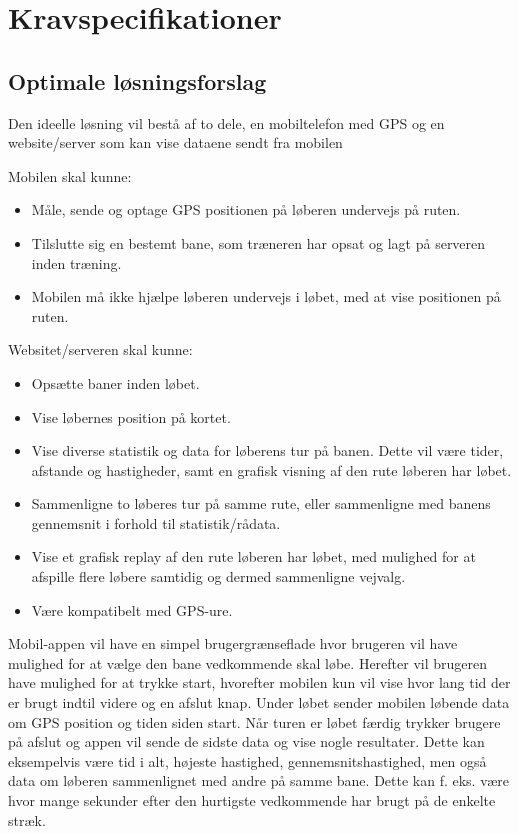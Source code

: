 \chapter{Kravspecifikationer}

\section{Optimale løsningsforslag}
Den ideelle løsning vil bestå af to dele, en mobiltelefon med GPS og en website/server som kan vise dataene sendt fra mobilen

Mobilen skal kunne:
\begin{itemize}
	\item Måle, sende og optage GPS positionen på løberen undervejs på ruten.
	\item Tilslutte sig en bestemt bane, som træneren har opsat og lagt på serveren inden træning.
	\item Mobilen må ikke hjælpe løberen undervejs i løbet, med at vise positionen på ruten.
\end{itemize}

Websitet/serveren skal kunne:
\begin{itemize}
	\item Opsætte baner inden løbet.
	\item Vise løbernes position på kortet.
	\item Vise diverse statistik og data for løberens tur på banen. Dette vil være tider, afstande og hastigheder, samt en grafisk visning af den rute løberen har løbet.
	\item Sammenligne to løberes tur på samme rute, eller sammenligne med banens gennemsnit i forhold til statistik/rådata.
	\item Vise et grafisk replay af den rute løberen har løbet, med mulighed for at afspille flere løbere samtidig og dermed sammenligne vejvalg.
	\item Være kompatibelt med GPS-ure.
\end{itemize} 

Mobil-appen vil have en simpel brugergrænseflade hvor brugeren vil have mulighed for at vælge den bane vedkommende skal løbe. Herefter vil brugeren have mulighed for at trykke start, hvorefter mobilen kun vil vise hvor lang tid der er brugt indtil videre og en afslut knap. Under løbet sender mobilen løbende data om GPS position og tiden siden start. Når turen er løbet færdig trykker brugere på afslut og appen vil sende de sidste data og vise nogle resultater. Dette kan eksempelvis være tid i alt, højeste hastighed, gennemsnitshastighed, men også data om løberen sammenlignet med andre på samme bane. Dette kan f. eks. være hvor mange sekunder efter den hurtigste vedkommende har brugt på de enkelte stræk.

